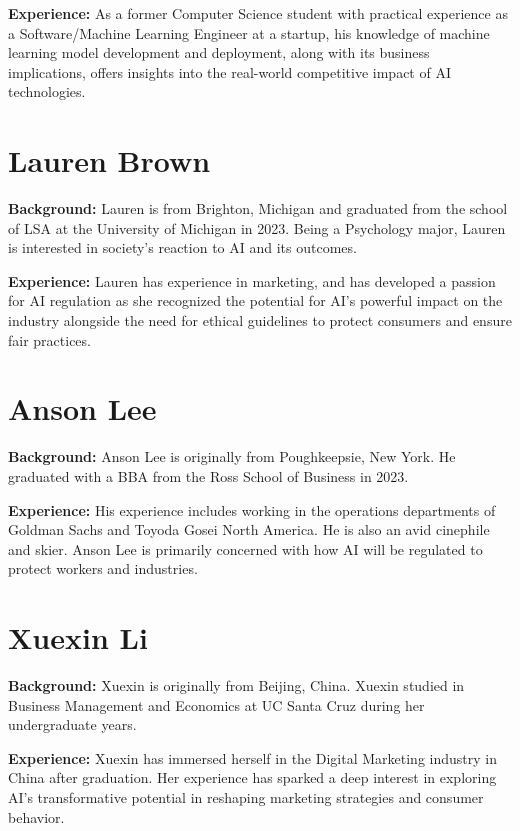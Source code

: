 \documentclass[
]{book}
\begin{document}
\textbf{Experience:}
As a former Computer Science student with practical experience as a Software/Machine Learning Engineer at a startup, his knowledge of machine learning model development and deployment, along with its business implications, offers insights into the real-world competitive impact of AI technologies.

\hypertarget{lauren-brown}{%
\section{Lauren Brown}\label{lauren-brown}}

\textbf{Background:}
Lauren is from Brighton, Michigan and graduated from the school of LSA at the University of Michigan in 2023. Being a Psychology major, Lauren is interested in society's reaction to AI and its outcomes.

\textbf{Experience:}
Lauren has experience in marketing, and has developed a passion for AI regulation as she recognized the potential for AI's powerful impact on the industry alongside the need for ethical guidelines to protect consumers and ensure fair practices.

\hypertarget{anson-lee}{%
\section{Anson Lee}\label{anson-lee}}

\textbf{Background:}
Anson Lee is originally from Poughkeepsie, New York. He graduated with a BBA from the Ross School of Business in 2023.

\textbf{Experience:}
His experience includes working in the operations departments of Goldman Sachs and Toyoda Gosei North America. He is also an avid cinephile and skier. Anson Lee is primarily concerned with how AI will be regulated to protect workers and industries.

\hypertarget{xuexin-li}{%
\section{Xuexin Li}\label{xuexin-li}}

\textbf{Background:}
Xuexin is originally from Beijing, China. Xuexin studied in Business Management and Economics at UC Santa Cruz during her undergraduate years.

\textbf{Experience:} Xuexin has immersed herself in the Digital Marketing industry in China after graduation. Her experience has sparked a deep interest in exploring AI's transformative potential in reshaping marketing strategies and consumer behavior.
\end{document}
